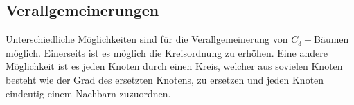 \subsection{Verallgemeinerungen}
Unterschiedliche Möglichkeiten sind für die Verallgemeinerung von $C_3-$Bäumen möglich. Einerseits ist es möglich die Kreisordnung zu erhöhen. Eine andere Möglichkeit ist es jeden Knoten durch einen Kreis, welcher aus sovielen Knoten besteht wie der Grad des ersetzten Knotens, zu ersetzen und jeden Knoten eindeutig einem Nachbarn zuzuordnen.


